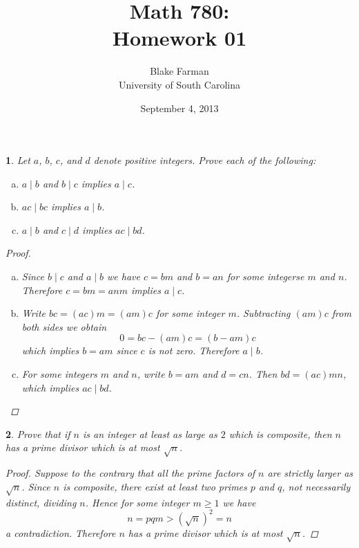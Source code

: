 \documentclass[10pt]{amsart}
\author{Blake Farman\\University of South Carolina}
\title{Math 780:\\Homework 01}
\date{September 4, 2013}
\begin{document}
\maketitle

\providecommand{\p}{\mathfrak{p}}
\providecommand{\m}{\mathfrak{m}}

\newtheorem{thm}{}
\newtheorem{lem}{Lemma}

\begin{thm}\label{ex1}
  Let $a$, $b$, $c$, and $d$ denote positive integers.
  Prove each of the following:
  \begin{enumerate}[(a)]
  \item
    $a \mid b$ and $b \mid c$ implies $a \mid c$.
  \item
    $ac \mid bc$ implies $a \mid b$.
  \item
    $a \mid b$ and $c \mid d$ implies $ac \mid bd$.
  \end{enumerate}
  
  \begin{proof}
    \begin{enumerate}[(a)]
    \item
      Since $b \mid c$ and $a \mid b$ we have $c = bm$ and $b = an$ for some integerse $m$ and $n$.
      Therefore $c = bm = anm$ implies $a \mid c$.
    \item
      Write $bc = (ac)m = (am)c$ for some integer $m$.
      Subtracting $(am)c$ from both sides we obtain
      $$0 = bc - (am)c = (b - am)c$$
      which implies $b = am$ since $c$ is not zero.
      Therefore $a \mid b$.
    \item
      For some integers $m$ and $n$, write $b = am$ and $d = cn$.
      Then $bd = (ac)mn$, which implies $ac \mid bd$.
    \end{enumerate}
  \end{proof}
\end{thm}

\begin{thm}\label{ex2}
  Prove that if $n$ is an integer at least as large as $2$ which is composite, then $n$ has a prime divisor which is at most $\sqrt{n}$.

  \begin{proof}
    Suppose to the contrary that all the prime factors of $n$ are strictly larger as $\sqrt{n}$.
    Since $n$ is composite, there exist at least two primes $p$ and $q$, not necessarily distinct, dividing $n$.
    Hence for some integer $m \geq 1$ we have
    $$n = pqm > (\sqrt{n})^2 = n$$
    a contradiction.
    Therefore $n$ has a prime divisor which is at most $\sqrt{n}$.
  \end{proof}
\end{thm}
\end{document}
